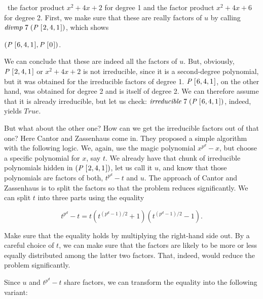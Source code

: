 \documentclass[tikz]{scrreprt}
\newcommand{\Conid}[1]{\mathit{#1}}
\newcommand{\Varid}[1]{\mathit{#1}}
\begin{document}
\ie\ the factor product $x^2 + 4x + 2$ for degree 1
and the factor product $x^2 + 4x + 6$ for degree 2.
First, we make sure that these are really factors
of $u$ by calling \ensuremath{\Varid{divmp}\;\mathrm{7}\;(\Conid{P}\;[\mskip1.5mu \mathrm{2},\mathrm{4},\mathrm{1}\mskip1.5mu])}, which shows

\ensuremath{(\Conid{P}\;[\mskip1.5mu \mathrm{6},\mathrm{4},\mathrm{1}\mskip1.5mu],\Conid{P}\;[\mskip1.5mu \mathrm{0}\mskip1.5mu])}.

We can conclude that these are indeed all the factors
of $u$. But, obviously, \ensuremath{\Conid{P}\;[\mskip1.5mu \mathrm{2},\mathrm{4},\mathrm{1}\mskip1.5mu]} or $x^2 + 4x + 2$ is
not irreducible, since it is a second-degree polynomial,
but it was obtained for the irreducible factors of degree 1.
\ensuremath{\Conid{P}\;[\mskip1.5mu \mathrm{6},\mathrm{4},\mathrm{1}\mskip1.5mu]}, on the other hand, was obtained for degree 2
and is itself of degree 2. We can therefore assume that
it is already irreducible, but let us check: 
\ensuremath{\Varid{irreducible}\;\mathrm{7}\;(\Conid{P}\;[\mskip1.5mu \mathrm{6},\mathrm{4},\mathrm{1}\mskip1.5mu])}, indeed, yields \ensuremath{\Conid{True}}.

But what about the other one? How can we get the irreducible
factors out of that one? Here Cantor and Zassenhaus come in.
They proposed a simple algorithm with the following logic.
We, again, use the magic polynomial $x^{p^d} - x$, but choose 
a specific polynomial for $x$, say $t$. We already have
that chunk of irreducible polynomials hidden in \ensuremath{(\Conid{P}\;[\mskip1.5mu \mathrm{2},\mathrm{4},\mathrm{1}\mskip1.5mu])},
let us call it $u$,
and know that those polynomials are factors of both,
$t^{p^d} - t$ and $u$. 
The approach of Cantor and Zassenhaus is to split the factors
so that the problem reduces significantly. We can split $t$
into three parts using the equality

\begin{equation}
t^{p^d} - t = t(t^{(p^d-1)/2} + 1)(t^{(p^d-1)/2} - 1).
\end{equation}

Make sure that the equality holds 
by multiplying the right-hand side out.
By a careful choice of $t$, we can make sure that the factors
are likely to be more or less equally distributed among the
latter two factors. That, indeed, would reduce the problem significantly.

Since $u$ and $t^{p^d} - t$ share factors, we can transform
the equality into the following variant:
\end{document}
